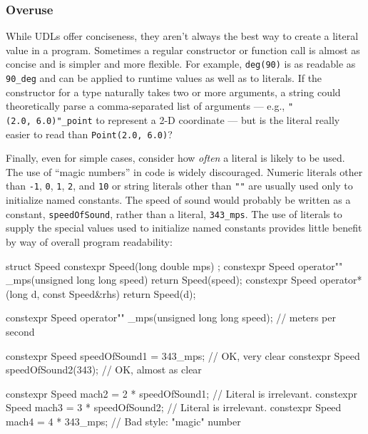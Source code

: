 \subsubsection[Overuse]{Overuse}\label{overuse-defmemberinit}

While UDLs offer conciseness, they aren't always the best way to create
a literal value in a program. Sometimes a regular constructor or
function call is almost as concise and is simpler and more flexible. For
example, \lstinline!deg(90)! is as readable as \lstinline!90_deg! and can be
applied to runtime values as well as to literals. If the constructor for
a type naturally takes two or more arguments, a string  could theoretically parse a comma-separated list of arguments
--- e.g., \lstinline!"(2.0,!~\lstinline!6.0)"_point! to represent a 2-D
coordinate --- but is the literal really easier to read than
\lstinline!Point(2.0,!~\lstinline!6.0)!?

Finally, even for simple cases, consider how \emph{often} a literal is
likely to be used. The use of ``magic numbers'' in code is widely
discouraged. Numeric literals other than \lstinline!-1!, \lstinline!0!,
\lstinline!1!, \lstinline!2!, and \lstinline!10! or string literals other than
\lstinline!""! are usually used only to initialize named constants. The
speed of sound would probably be written as a constant,
\lstinline!speedOfSound!, rather than a literal, \lstinline!343_mps!. The use
of literals to supply the special values used to initialize named
constants provides little benefit by way of overall program readability:

\begin{emcppshiddenlisting}[emcppsbatch=e22]
struct Speed    { constexpr Speed(long double mps) {} };
constexpr Speed operator"" _mps(unsigned long long speed) { return Speed(speed); }
constexpr Speed operator*(long d, const Speed&rhs) { return Speed(d); }
\end{emcppshiddenlisting}
\begin{emcppslisting}[emcppsbatch=e22]
constexpr Speed operator"" _mps(unsigned long long speed);  // meters per second

constexpr Speed speedOfSound1 = 343_mps;   // OK, very clear
constexpr Speed speedOfSound2(343);        // OK, almost as clear

constexpr Speed mach2 = 2 * speedOfSound1; // Literal is irrelevant.
constexpr Speed mach3 = 3 * speedOfSound2; // Literal is irrelevant.
constexpr Speed mach4 = 4 * 343_mps;       // Bad style: "magic" number
\end{emcppslisting}
    
